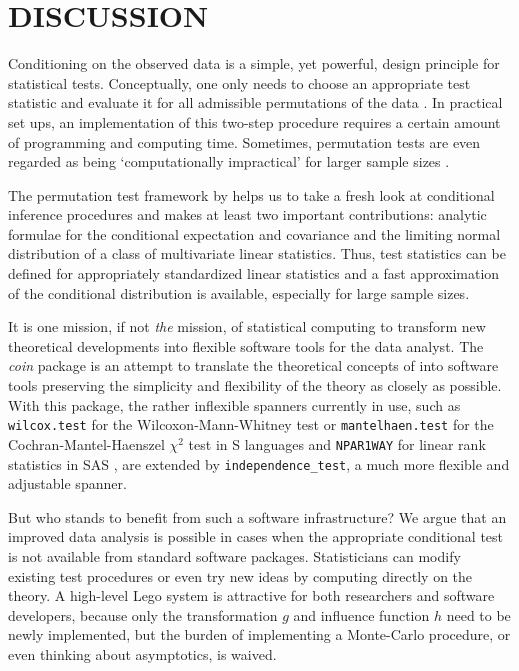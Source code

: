 \documentclass{article}
\newcommand{\Rpackage}[1]{\textit{#1}}
\newcommand{\Rcmd}[1]{\texttt{#1}}
\renewcommand{\S}{\textsf{S}}
\begin{document}
\section{DISCUSSION}

Conditioning on the observed data is a simple, yet powerful, design
principle for statistical tests. Conceptually, one only needs to choose
an appropriate test statistic and evaluate it for all admissible 
permutations of the data \citep[][gives some examples]{Ernst2004}. 
In practical set ups, an implementation of this
two-step procedure requires a certain amount of programming 
and computing time. Sometimes, permutation tests are even regarded 
as being `computationally impractical'
for larger sample sizes \citep{BalkinMallows2001}. 

The permutation test framework by \cite{StrasserWeber1999} helps us to take
a fresh look at conditional inference procedures and makes at least 
two important contributions: analytic formulae for the 
conditional expectation and covariance and the limiting normal distribution
of a class of multivariate linear statistics. Thus, test statistics can be
defined for appropriately standardized linear statistics and a fast
approximation of the conditional distribution is available, 
especially for large sample sizes. 

It is one mission, if not \textit{the} mission, of statistical computing to
transform new theoretical developments into flexible software tools for the
data analyst. The \Rpackage{coin} package is an attempt to translate 
the theoretical concepts of \cite{StrasserWeber1999} into software tools 
preserving the simplicity and flexibility of 
the theory as closely as possible. With this package, the rather inflexible spanners
currently in use,
such as \Rcmd{wilcox.test} for the Wilcoxon-Mann-Whitney test or
\Rcmd{mantelhaen.test} for the Cochran-Mantel-Haenszel $\chi^2$ test in
\S{} languages and \texttt{NPAR1WAY} for linear rank statistics in \textsf{SAS}
\citep[see the Tables in][for
an overview on procedures implemented in \textsf{StatXact}, \textsf{LogXact},
\textsf{Stata}, \textsf{SAS} and \textsf{Testimate}]{Oster2002,Oster2003}, 
are extended by \Rcmd{independence\_test}, a much more flexible and adjustable spanner.

But who stands to benefit from such a software infrastructure? We argue 
that an improved data analysis is possible in cases when the appropriate 
conditional test is not available from standard software packages.
Statisticians can modify existing test procedures or even try new ideas by
computing directly on the theory. A high-level Lego system is attractive for
both researchers and software developers, because only the transformation $g$ and influence
function $h$ need to be newly implemented, but the burden of implementing a
Monte-Carlo procedure, or even thinking about asymptotics, 
is waived. 
\end{document}
